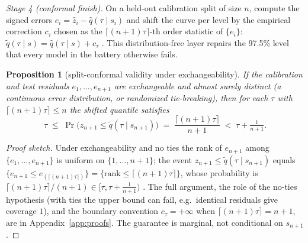 \documentclass[11pt]{article}
\newtheorem{proposition}{Proposition}
\theoremstyle{remark}
\begin{document}
\emph{Stage 4 (conformal finish).} On a held-out calibration split of
size $n$, compute the signed errors
$e_i = \widehat{z}_i - \widehat{q}(\tau \mid s_i)$ and shift the curve
per level by the empirical correction $c_\tau$ chosen as the
$\lceil (n{+}1)\tau \rceil$-th order statistic of $\{e_i\}$:
$\widetilde{q}(\tau \mid s) = \widehat{q}(\tau \mid s) + c_\tau$
\citep{vovk2005, romano2019cqr}. This distribution-free layer repairs
the 97.5\% level that every model in the battery otherwise fails.

\begin{proposition}[split-conformal validity under
exchangeability]\label{prop:conformal}
If the calibration and test residuals $e_1,\dots,e_{n+1}$ are
exchangeable and almost surely distinct (a continuous error
distribution, or randomized tie-breaking), then for each $\tau$ with
$\lceil(n{+}1)\tau\rceil \le n$ the shifted quantile satisfies
\[
\tau \;\le\; \Pr\big(z_{n+1} \le \widetilde{q}(\tau \mid s_{n+1})\big)
\;=\; \frac{\lceil(n{+}1)\tau\rceil}{n+1}
\;<\; \tau + \tfrac{1}{n+1}.
\]
\end{proposition}
\begin{proof}[Proof sketch]
Under exchangeability and no ties the rank of $e_{n+1}$ among
$\{e_1,\dots,e_{n+1}\}$ is uniform on $\{1,\dots,n+1\}$; the event
$z_{n+1}\le\widetilde{q}(\tau\mid s_{n+1})$ equals $\{e_{n+1}\le
e_{(\lceil(n+1)\tau\rceil)}\}=\{\mathrm{rank}\le\lceil(n{+}1)\tau\rceil\}$,
whose probability is $\lceil(n{+}1)\tau\rceil/(n+1)\in[\tau,\tau+\tfrac1{n+1})$
\citep{vovk2005}. The full argument, the role of the no-ties
hypothesis (with ties the upper bound can fail, e.g.\ identical
residuals give coverage $1$), and the boundary convention
$c_\tau=+\infty$ when $\lceil(n{+}1)\tau\rceil=n+1$, are in
Appendix~\ref{app:proofs}. The guarantee is marginal, not conditional
on $s_{n+1}$.
\end{proof}
\end{document}
